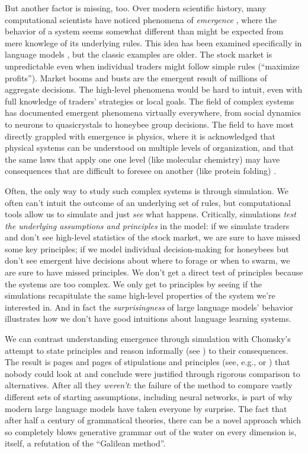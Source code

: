 \documentclass[output=paper,colorlinks,citecolor=brown]{langscibook}
\begin{document}
But another factor is missing, too. Over modern scientific history, many computational scientists have noticed phenomena of \textit{emergence} \citep{goldstein1999emergence,mcclelland2010emergence}, where the behavior of a system seems somewhat different than might be expected from mere knowlege of its underlying rules. This idea has been examined specifically in language models \citep{wei2022emergent,manning2020emergent}, but the classic examples are older. The stock market is unpredictable even when individual traders might follow simple rules (``maximize profits''). Market booms and busts are the emergent result of millions of aggregate decisions. The high-level phenomena would be hard to intuit, even with full knowledge of traders' strategies or local goals. The field of complex systems has documented emergent phenomena virtually everywhere, from social dynamics to neurons to quasicrystals to honeybee group decisions. The field to have most directly grappled with emergence is physics, where it is acknowledged that physical systems can be understood on multiple levels of organization, and that the same laws that apply one one level (like molecular chemistry) may have consequences that are difficult to foresee on another (like protein folding) \citep{anderson1972more,crutchfield1994anything,crutchfield1994calculi}. 

Often, the only way to study such complex systems is through simulation. We often can't intuit the outcome of an underlying set of rules, but computational tools allow us to simulate and just \textit{see} what happens. Critically, simulations \textit{test the underlying assumptions and principles} in the model: if we simulate traders and don't see high-level statistics of the stock market, we are sure to have missed some key principles; if we model individual decision-making for honeybees but don't see emergent hive decisions about where to forage or when to swarm, we are sure to have missed principles. We don't get a direct test of principles because the systems are too complex. We only get to principles by seeing if the simulations recapitulate the same high-level properties of the system we're interested in. And in fact the \textit{surprisingness} of large language models' behavior illustrates how we don't have good intuitions about language learning systems. 

We can contrast understanding emergence through simulation with Chomsky's attempt to state principles and reason informally (see \citealt{pullum1989formal}) to their consequences. The result is pages and pages of stipulations and principles (see, e.g., \citealt{collins2016formalization} or \citealt{chomsky1995minimalist}) that nobody could look at and conclude were justified through rigorous comparison to alternatives. After all they \textit{weren't}: the failure of the method to compare vastly different sets of starting assumptions, including neural networks, is part of why modern large language models have taken everyone by surprise. The fact that after half a century of grammatical theories, there can be a novel approach which so completely blows generative grammar out of the water on every dimension is, itself, a refutation of the ``Galilean method''.
\end{document}
